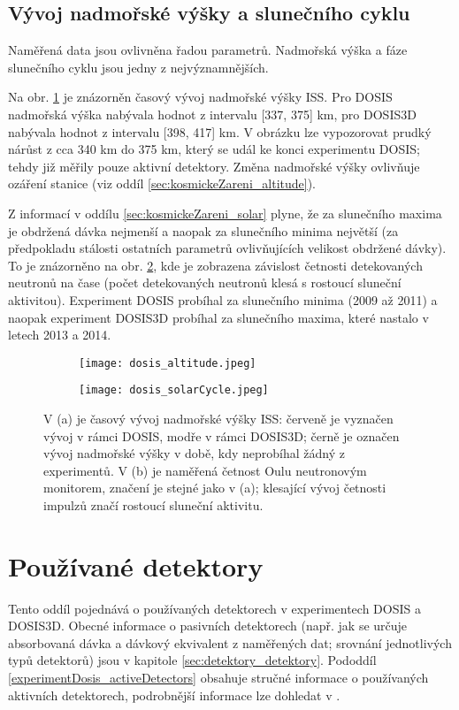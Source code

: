 \subsection{Vývoj nadmořské výšky a slunečního cyklu}\label{sec:dosis_altitudeSlunecniCyklus} %
Naměřená data jsou ovlivněna řadou parametrů. Nadmořská výška a fáze slunečního cyklu jsou jedny z nejvýznamnějších. 

Na obr. \ref{subfig:dosis_altitude} je znázorněn časový vývoj nadmořské výšky ISS. Pro DOSIS nadmořská výška nabývala hodnot z intervalu [337, 375] km, pro DOSIS3D nabývala hodnot z intervalu [398, 417] km. V obrázku lze vypozorovat prudký nárůst z cca 340 km do 375 km, který se udál ke konci experimentu DOSIS; tehdy již měřily pouze aktivní detektory. Změna nadmořské výšky ovlivňuje ozáření stanice (viz oddíl \ref{sec:kosmickeZareni_altitude}). 

Z informací v oddílu \ref{sec:kosmickeZareni_solar} plyne, že za slunečního maxima je obdržená dávka nejmenší a naopak za slunečního minima největší (za předpokladu stálosti ostatních parametrů ovlivňujících velikost obdržené dávky). To je znázorněno na obr. \ref{subfig:dosis_solarCycle}, kde je zobrazena závislost četnosti detekovaných neutronů na čase (počet detekovaných neutronů klesá s rostoucí sluneční aktivitou). Experiment DOSIS probíhal za slunečního minima (2009 až 2011) a naopak experiment DOSIS3D probíhal za slunečního maxima, které nastalo v letech 2013 a 2014.   
\begin{figure}[h]
  \centering
  \begin{subfigure}{0.45\textwidth}
    \texttt{[image: dosis\_altitude.jpeg]}
    \caption{}
    \label{subfig:dosis_altitude}
  \end{subfigure}
  \begin{subfigure}{0.45\textwidth}
    \texttt{[image: dosis\_solarCycle.jpeg]}
    \caption{}
    \label{subfig:dosis_solarCycle}
  \end{subfigure}
  \caption{V (a) je časový vývoj nadmořské výšky ISS: červeně je vyznačen vývoj v rámci DOSIS, modře v rámci DOSIS3D; černě je označen vývoj nadmořské výšky v době, kdy neprobíhal žádný z experimentů. V (b) je naměřená četnost Oulu neutronovým monitorem, značení je stejné jako v (a); klesající vývoj četnosti impulzů značí rostoucí sluneční aktivitu. \cite{dosis,dosis_oulu}} 
  \label{fig:dosis_parameters}
\end{figure}

\section{Používané detektory}%
Tento oddíl pojednává o používaných detektorech v experimentech DOSIS a DOSIS3D. Obecné informace o pasivních detektorech (např. jak se určuje absorbovaná dávka a dávkový ekvivalent z naměřených dat; srovnání jednotlivých typů detektorů) jsou v kapitole \ref{sec:detektory_detektory}. Pododdíl \ref{experimentDosis_activeDetectors} obsahuje stručné informace o používaných aktivních detektorech, podrobnější informace lze dohledat v \cite{activeDetectors,dosis2}.

